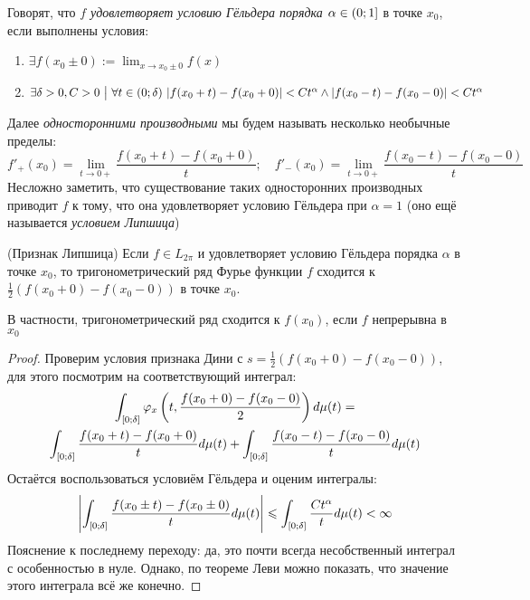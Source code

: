 \begin{definition}
	Говорят, что \textit{$f$ удовлетворяет условию Гёльдера порядка $\alpha \in \left(0; 1\right]$} в точке $x_0$, если выполнены условия:
	\begin{enumerate}
		\item $\exists f(x_0 \pm 0) := \lim_{x \to x_0 \pm 0} f(x)$
		
		\item $\exists \delta > 0, C > 0 \ \big|\  \forall t \in (0; \delta)\ |f(x_0 + t) - f(x_0 + 0)| < Ct^\alpha \wedge |f(x_0 - t) - f(x_0 - 0)| < Ct^\alpha$
	\end{enumerate}
\end{definition}

\begin{note}
	Далее \textit{односторонними производными} мы будем называть несколько необычные пределы:
	\[
		f'_+(x_0) = \lim_{t \to 0+} \frac{f(x_0 + t) - f(x_0 + 0)}{t}; \quad f'_-(x_0) = \lim_{t \to 0+} \frac{f(x_0 - t) - f(x_0 - 0)}{t}
	\]
	Несложно заметить, что существование таких односторонних производных приводит $f$ к тому, что она удовлетворяет условию Гёльдера при $\alpha = 1$ (оно ещё называется \textit{условием Липшица})
\end{note}

\begin{theorem} (Признак Липшица)
	Если $f \in L_{2\pi}$ и удовлетворяет условию Гёльдера порядка $\alpha$ в точке $x_0$, то тригонометрический ряд Фурье функции $f$ сходится к $\frac{1}{2}(f(x_0 + 0) - f(x_0 - 0))$ в точке $x_0$.
\end{theorem}

\begin{note}
	В частности, тригонометрический ряд сходится к $f(x_0)$, если $f$ непрерывна в $x_0$
\end{note}

\begin{proof}
	Проверим условия признака Дини с $s = \frac{1}{2}(f(x_0 + 0) - f(x_0 - 0))$, для этого посмотрим на соответствующий интеграл:
	\begin{multline*}
		\int_{[0; \delta]} \varphi_x\left(t, \frac{f(x_0 + 0) - f(x_0 - 0)}{2}\right)d\mu(t) =
		\\
		\int_{[0; \delta]} \frac{f(x_0 + t) - f(x_0 + 0)}{t}d\mu(t) + \int_{[0; \delta]} \frac{f(x_0 - t) - f(x_0 - 0)}{t}d\mu(t)
	\end{multline*}
	Остаётся воспользоваться условиём Гёльдера и оценим интегралы:
	\[
		\left|\int_{[0; \delta]} \frac{f(x_0 \pm t) - f(x_0 \pm 0)}{t}d\mu(t)\right| \leqslant \int_{[0; \delta]} \frac{Ct^\alpha}{t}d\mu(t) < \infty
	\]
	Пояснение к последнему переходу: да, это почти всегда несобственный интеграл с особенностью в нуле. Однако, по теореме Леви можно показать, что значение этого интеграла всё же конечно.
\end{proof}


